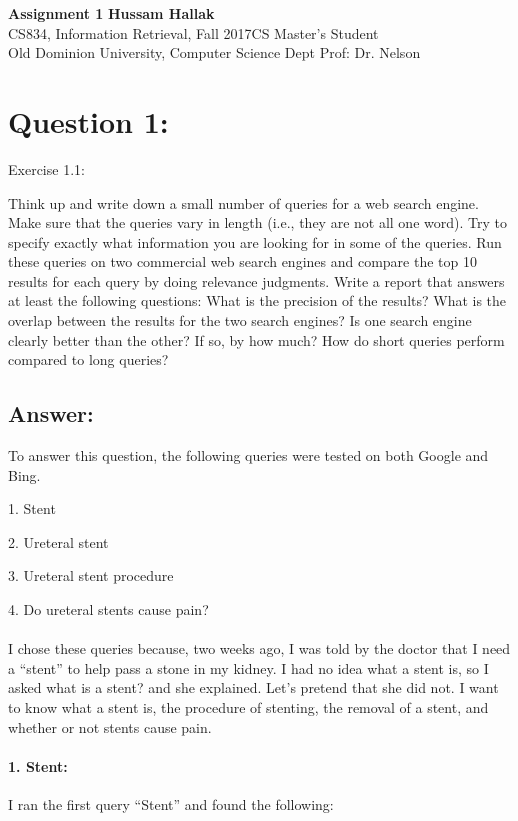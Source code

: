 \documentclass[a4paper, 11pt]{article}
\begin{document}
\noindent
\large\textbf{Assignment 1} \hfill \textbf{Hussam Hallak} \\
\normalsize CS834, Information Retrieval, Fall 2017\hfill CS Master's Student \\
Old Dominion University, Computer Science Dept \hfill Prof: Dr. Nelson 

\section*{Question 1:}
Exercise 1.1: 

Think up and write down a small number of queries for a web search engine.
Make sure that the queries vary in length (i.e., they are not all one word). Try
to specify exactly what information you are looking for in some of the queries.
Run these queries on two commercial web search engines and compare the top
10 results for each query by doing relevance judgments. Write a report that answers
at least the following questions: What is the precision of the results? What
is the overlap between the results for the two search engines? Is one search engine
clearly better than the other? If so, by how much? How do short queries perform
compared to long queries?

\subsection*{Answer:}
To answer this question, the following queries were tested on both Google and Bing. 

1. Stent

2. Ureteral stent

3. Ureteral stent procedure

4. Do ureteral stents cause pain?

\paragraph{}

I chose these queries because, two weeks ago, I was told by the doctor that I need a ``stent'' to help pass a stone in my kidney. I had no idea what a stent is, so I asked what is a stent? and she explained. Let's pretend that she did not. I want to know what a stent is, the procedure of stenting, the removal of a stent, and whether or not stents cause pain.

\paragraph{1. Stent:}
I ran the first query ``Stent'' and found the following:
\end{document}
